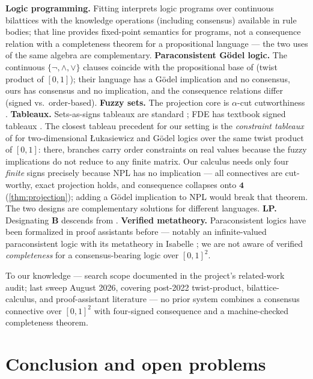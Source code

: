 \documentclass[11pt,a4paper]{article}
\theoremstyle{definition}
\newcommand{\FOUR}{\mathbf{4}}
\newcommand{\vB}{\mathbf{B}}
\begin{document}
\textbf{Logic programming.} Fitting \cite{fitting1991bilattices}
interprets logic programs over continuous bilattices with the knowledge
operations (including consensus) available in rule bodies; that line
provides fixed-point semantics for programs, not a consequence relation
with a completeness theorem for a propositional language --- the two uses
of the same algebra are complementary. \textbf{Paraconsistent G\"odel
logic.} The continuous $\{\lnot,\wedge,\vee\}$ clauses coincide with the
propositional base of \cite{bilkova2022paraconsistent} (twist product of
$[0,1]$); their language has a G\"odel implication and no consensus, ours
has consensus and no implication, and the consequence relations differ
(signed vs.\ order-based). \textbf{Fuzzy sets.} The projection core is
$\alpha$-cut cutworthiness \cite[\S\S~1.3--1.4]{klir1995fuzzy}. \textbf{Tableaux.}
Sets-as-signs tableaux are standard \cite{haehnle1994automated}; FDE has
textbook signed tableaux \cite[Ch.~8]{priest2008introduction}. The closest tableau
precedent for our setting is the \emph{constraint tableaux} of
\cite{bilkova2021constraint} for two-dimensional \L{}ukasiewicz and
G\"odel logics over the same twist product of $[0,1]$: there, branches
carry order constraints on real values because the fuzzy implications do
not reduce to any finite matrix. Our calculus needs only four \emph{finite}
signs precisely because NPL has no implication --- all connectives are
cut-worthy, exact projection holds, and consequence collapses onto $\FOUR$
(\cref{thm:projection}); adding a G\"odel implication to NPL would break
that theorem. The two designs are complementary solutions for different
languages. \textbf{LP.} Designating $\vB$ descends from
\cite{priest1979logic}. \textbf{Verified metatheory.} Paraconsistent logics
have been formalized in proof assistants before --- notably an
infinite-valued paraconsistent logic with its metatheory in Isabelle
\cite{villadsen2017formalizing}; we are not aware of verified
\emph{completeness} for a consensus-bearing logic over $[0,1]^2$.

To our knowledge --- search scope documented in the project's related-work
audit; last sweep August 2026, covering post-2022 twist-product,
bilattice-calculus, and proof-assistant literature --- no prior system
combines a consensus connective over $[0,1]^2$ with four-signed consequence
and a machine-checked completeness theorem.

\section{Conclusion and open problems}\label{sec:conclusion}
\end{document}
